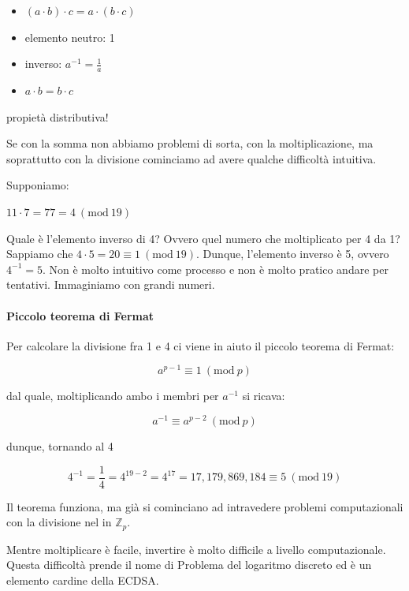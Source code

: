 \documentclass{book}
\theoremstyle{definition}
\newcommand{\Mod}[1]{\ (\mathrm{mod}\ #1)}
\newcommand{\Zp}{\mathbb{Z}_{p}}
\begin{document}
\begin{itemize}
    \item $(a \cdot b) \cdot c = a \cdot (b \cdot c)$
    \item elemento neutro: 1
    \item inverso: $a^{-1} = \frac{1}{a}$
    \item $a \cdot b = b \cdot c$
\end{itemize}

propietà distributiva!

Se con la somma non abbiamo problemi di sorta, con la moltiplicazione, ma soprattutto con la divisione cominciamo ad avere qualche difficoltà intuitiva.

Supponiamo:

$11 \cdot 7 = 77 = 4 \Mod{19}$

Quale è l’elemento inverso di 4? Ovvero quel numero che moltiplicato per 4 da 1? 
Sappiamo che $4 \cdot 5 = 20 \equiv 1 \Mod{19}$. 
Dunque, l’elemento inverso è 5, ovvero $4^{-1} = 5$. 
Non è molto intuitivo come processo e non è molto pratico andare per tentativi. Immaginiamo con grandi numeri.

\paragraph{Piccolo teorema di Fermat}
Per calcolare la divisione fra 1 e 4 ci viene in aiuto il piccolo teorema di Fermat:

\begin{equation}
    a^{p-1} \equiv 1 \Mod{p} \label{piccolo_teorema_di_fermat}
\end{equation}

dal quale, moltiplicando ambo i membri per $a^{-1}$ si ricava:

\begin{equation}
    a^{-1} \equiv a^{p-2} \Mod{p} \label{piccolo_teorema_di_fermat}
\end{equation}

dunque, tornando al 4

$$
4^{-1} = \frac{1}{4} = 4^{19-2} = 4^{17} = 17,179,869,184 \equiv 5 \Mod{19}
$$

Il teorema funziona, ma già si cominciano ad intravedere problemi computazionali con la divisione nel in $\Zp$.

Mentre moltiplicare è facile, invertire è molto difficile a livello computazionale. 
Questa difficoltà prende il nome di Problema del logaritmo discreto ed è un elemento cardine della ECDSA.
\end{document}

